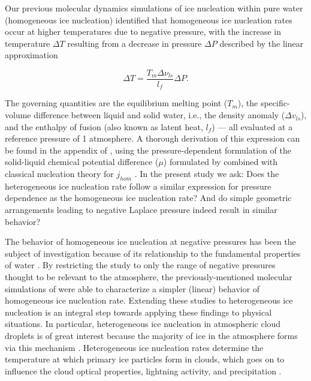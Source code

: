 \documentclass[journal abbreviation, manuscript]{copernicus}
\begin{document}

Our previous molecular dynamics simulations of ice nucleation within pure water (homogeneous ice nucleation) identified that homogeneous ice nucleation rates occur at higher temperatures due to negative pressure, with the increase in temperature $\Delta T$ resulting from a decrease in pressure $\Delta P$ described by the linear approximation \citep{rosky2022}

\begin{equation} \label{eq:dTdP}
    \Delta T = \frac{T_m \Delta \nu_{ls}}{l_f} \Delta P.
\end{equation}

\noindent The governing quantities are the equilibrium melting point ($T_m$), the specific-volume difference between liquid and solid water, i.e., the density anomaly ($\Delta v_{ls}$), and the enthalpy of fusion (also known as latent heat, $l_f$) --- all evaluated at a reference pressure of 1 atmosphere. A thorough derivation of this expression can be found in the appendix of \citet{rosky2022}, using the pressure-dependent formulation of the solid-liquid chemical potential difference ($\mu$) formulated by \citet{nemec2013} combined with classical nucleation theory for $j_{hom}$ \citep[see also][]{yang2018}. In the present study we ask: Does the heterogeneous ice nucleation rate follow a similar expression for pressure dependence as the homogeneous ice nucleation rate? And do simple geometric arrangements leading to negative Laplace pressure indeed result in similar behavior?

The behavior of homogeneous ice nucleation at negative pressures has been the subject of investigation because of its relationship to the fundamental properties of water \citep[e.g.,][]{bianco2021}. By restricting the study to only the range of negative pressures thought to be relevant to the atmosphere, the previously-mentioned molecular simulations of \citet{rosky2022} were able to characterize a simpler (linear) behavior of homogeneous ice nucleation rate. Extending these studies to heterogeneous ice nucleation is an integral step towards applying these findings to physical situations. In particular, heterogeneous ice nucleation in atmospheric cloud droplets is of great interest because the majority of ice in the atmosphere forms via this mechanism \citep{cantrell2005production,hoose2012heterogeneous}. Heterogeneous ice nucleation rates determine the temperature at which primary ice particles form in clouds, which goes on to influence the cloud optical properties, lightning activity, and precipitation \citep{lamb2011physics}. 
\end{document}

